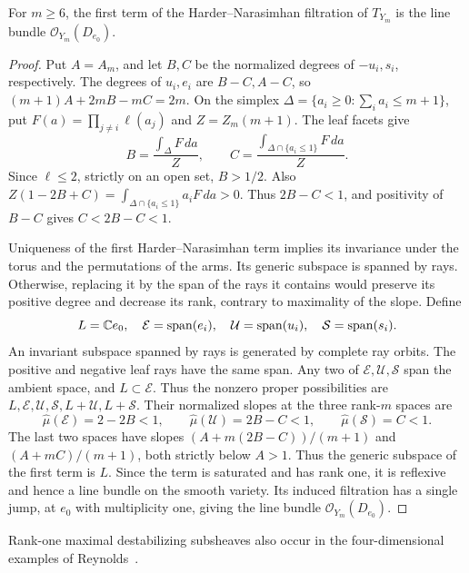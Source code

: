 \begin{corollary}\label{branch:hn}
For $m\ge6$, the first term of the Harder--Narasimhan filtration of
$T_{Y_m}$ is the line bundle $\mathcal O_{Y_m}(D_{e_0})$.
\end{corollary}

\begin{proof}
Put $A=A_m$, and let $B,C$ be the normalized degrees of $-u_i,s_i$,
respectively. The degrees of $u_i,e_i$ are $B-C,A-C$, so
$(m+1)A+2mB-mC=2m$. On the simplex
$\Delta=\{a_i\ge0:\sum_i a_i\le m+1\}$, put
$F(a)=\prod_{j\ne i}\ell(a_j)$ and $Z=Z_m(m+1)$. The leaf facets give
\[
 B=\frac{\int_\Delta F\,da}{Z},\qquad
 C=\frac{\int_{\Delta\cap\{a_i\le1\}}F\,da}{Z}.
\]
Since $\ell\le2$, strictly on an open set, $B>1/2$.
Also $Z(1-2B+C)=\int_{\Delta\cap\{a_i\le1\}}a_iF\,da>0$.
Thus $2B-C<1$, and positivity of $B-C$ gives $C<2B-C<1$.

Uniqueness of the first Harder--Narasimhan term implies its invariance
under the torus and the permutations of the arms. Its generic subspace
is spanned by rays. Otherwise, replacing it by the span of the rays it
contains would preserve its positive degree and decrease its rank,
contrary to maximality of the slope.
Define
\[
 L=\mathbb{C} e_0,\quad
 \mathcal E=\operatorname{span}(e_i),\quad
 \mathcal U=\operatorname{span}(u_i),\quad
 \mathcal S=\operatorname{span}(s_i).
\]
An invariant subspace spanned by rays is generated by complete ray
orbits. The positive and negative leaf rays have the same span. Any two of
$\mathcal E,\mathcal U,\mathcal S$ span the ambient space, and
$L\subset\mathcal E$. Thus the nonzero proper possibilities are
$L,\mathcal E,\mathcal U,\mathcal S,L+\mathcal U,L+\mathcal S$.
Their normalized slopes at the three rank-$m$ spaces are
\[
 \widehat\mu(\mathcal E)=2-2B<1,\qquad
 \widehat\mu(\mathcal U)=2B-C<1,\qquad
 \widehat\mu(\mathcal S)=C<1.
\]
The last two spaces have slopes
$(A+m(2B-C))/(m+1)$ and $(A+mC)/(m+1)$, both strictly below $A>1$.
Thus the generic subspace of the first term is $L$. Since the term is
saturated and has rank one, it is reflexive and hence a line bundle on
the smooth variety. Its induced filtration has a single jump, at $e_0$
with multiplicity one, giving the line bundle
$\mathcal O_{Y_m}(D_{e_0})$.
\end{proof}

Rank-one maximal destabilizing subsheaves also occur in the
four-dimensional examples of Reynolds~\cite[Appendix~A, p.~68]{Reynolds2023}.


